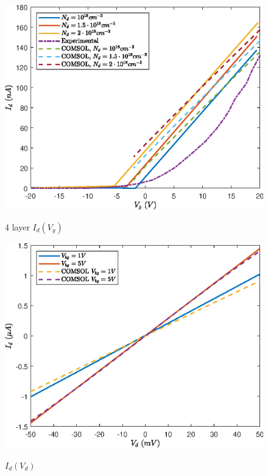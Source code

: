 \documentclass[12pt,a4paper,titlepage]{article}
\begin{document}
\begin{figure}[H]
	\centering
	\includegraphics[width=1\textwidth]{Grafici/4layer_Id(Vg).eps} 
	\label{fig:4layer_Id(Vg)}
	\caption{4 layer $I_d(V_g)$}
\end{figure}

\begin{figure}[H]
	\centering
	\includegraphics[width=1\textwidth]{Grafici/Id(Vd)_HfO2_MoS2.eps} 
	\label{fig:Id(Vd)_HfO2_MoS2}
	\caption{$I_d(V_d)$}
\end{figure}
\end{document}
